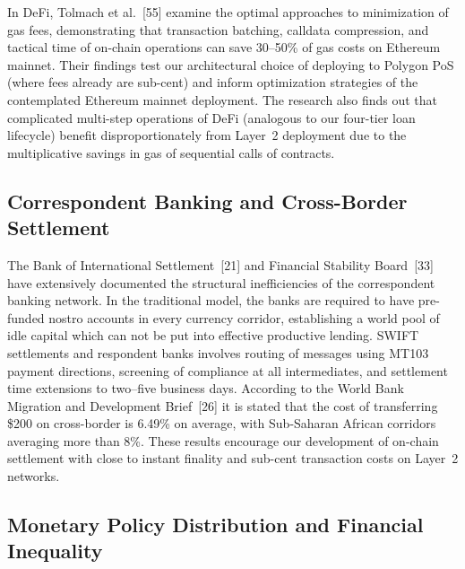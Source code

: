 \documentclass[12pt,a4paper]{report}
\begin{document}
In DeFi, Tolmach et al.~[55] examine the optimal approaches to minimization of gas fees, demonstrating that transaction batching, calldata compression, and tactical time of on-chain operations can save 30--50\% of gas costs on Ethereum mainnet. Their findings test our architectural choice of deploying to Polygon PoS (where fees already are sub-cent) and inform optimization strategies of the contemplated Ethereum mainnet deployment. The research also finds out that complicated multi-step operations of DeFi (analogous to our four-tier loan lifecycle) benefit disproportionately from Layer~2 deployment due to the multiplicative savings in gas of sequential calls of contracts.

\subsection{Correspondent Banking and Cross-Border Settlement}

The Bank of International Settlement~[21] and Financial Stability Board~[33] have extensively documented the structural inefficiencies of the correspondent banking network. In the traditional model, the banks are required to have pre-funded nostro accounts in every currency corridor, establishing a world pool of idle capital which can not be put into effective productive lending. SWIFT settlements and respondent banks involves routing of messages using MT103 payment directions, screening of compliance at all intermediates, and settlement time extensions to two--five business days. According to the World Bank Migration and Development Brief~[26] it is stated that the cost of transferring \$200 on cross-border is 6.49\% on average, with Sub-Saharan African corridors averaging more than 8\%. These results encourage our development of on-chain settlement with close to instant finality and sub-cent transaction costs on Layer~2 networks.

\subsection{Monetary Policy Distribution and Financial Inequality}
\end{document}
